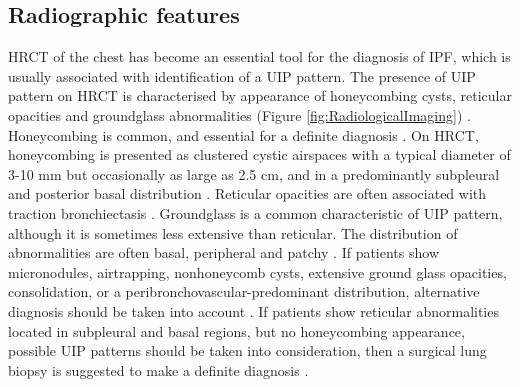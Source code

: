 \subsection{Radiographic features} \label{RadiographicFeatures}
HRCT of the chest has become an essential tool for the diagnosis of IPF, which is usually associated with identification of a UIP pattern. The presence of UIP pattern on HRCT is characterised by appearance of honeycombing cysts, reticular opacities and groundglass abnormalities (Figure \ref{fig:RadiologicalImaging}) \citep{king2011idiopathic,raghu2011official,richeldi2017idiopathic}. Honeycombing is common, and essential for a definite diagnosis \citep{raghu2011official}. On HRCT, honeycombing is presented as clustered cystic airspaces with a typical diameter of 3-10 mm but occasionally as large as 2.5 cm, and in a predominantly subpleural and posterior basal distribution \citep{hansell2008fleischner,richeldi2017idiopathic}. Reticular opacities are often associated with traction bronchiectasis \citep{nishimura1992usual, johkoh1999idiopathic}. Groundglass is a common characteristic of UIP pattern, although it is sometimes less extensive than reticular. The distribution of abnormalities are often basal, peripheral and patchy \citep{raghu2011official}. If patients show micronodules, airtrapping, nonhoneycomb cysts, extensive ground glass opacities, consolidation, or a peribronchovascular-predominant distribution, alternative diagnosis should be taken into account \citep{hwang2009computed, souza2006idiopathic}. If patients show reticular abnormalities located in subpleural and basal regions, but no honeycombing appearance, possible UIP patterns should be taken into consideration, then a surgical lung biopsy is suggested to make a definite diagnosis \citep{raghu2011official,richeldi2017idiopathic}. 

